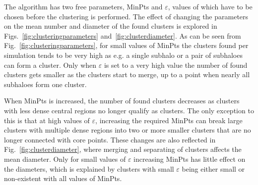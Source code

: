 \documentclass[english, oneside]{HYgradu}
\begin{document}

The algorithm has two free parameters, MinPts and $\varepsilon$, values of which have to be chosen before the clustering is performed. The effect of changing the parameters on the mean number and diameter of the found clusters is explored in Figs.~\ref{fig:clusteringparameters} and~\ref{fig:clusterdiameter}. As can be seen from Fig.~\ref{fig:clusteringparameters}, for small values of MinPts the clusters found per simulation tends to be very high as e.g. a single subhalo or a pair of subhaloes can form a cluster. Only when $\varepsilon$ is set to a very high value the number of found clusters gets smaller as the clusters start to merge, up to a point when nearly all subhaloes form one cluster.

When MinPts is increased, the number of found clusters decreases as clusters with less dense central regions no longer qualify as clusters. The only exception to this is that at high values of $\varepsilon$, increasing the required MinPts can break large clusters with multiple dense regions into two or more smaller clusters that are no longer connected with core points. These changes are also reflected in Fig.~\ref{fig:clusterdiameter}, where merging and separating of clusters affects the mean diameter. Only for small values of $\varepsilon$ increasing MinPts has little effect on the diameters, which is explained by clusters with small $\varepsilon$ being either small or non-existent with all values of MinPts.
\end{document}
